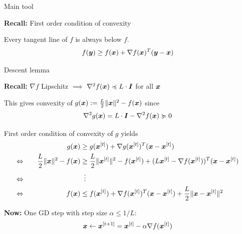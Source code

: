 \documentclass[11pt,compress,t,notes=noshow, xcolor=table]{beamer}
\begin{document}
\begin{framei}{Main tool}
\item\textbf{Recall:} First order condition of convexity
\begin{framed}\centering
Every tangent line of $f$ is always below $f$.
$$f(\bm{y}) \geq f(\bm{x}) + \nabla f(\bm{x})^T (\bm{y} - \bm{x})$$
\end{framed}
\end{framei}


\begin{framei}{Descent lemma}
\item\textbf{Recall:} $\nabla f$ Lipschitz $\implies$ $\nabla^2 f(\bm{x}) \preccurlyeq L \cdot \bm{I}$ for all $\bm{x}$
\item This gives convexity of $g(\bm{x}) := \frac{L}{2}\|\bm{x}\|^2 - f(\bm{x})$ since $$\nabla^2 g(\bm{x}) = L \cdot \bm{I} - \nabla^2 f(\bm{x}) \succcurlyeq 0$$
\item First order condition of convexity of $g$ yields
\begin{alignat*}{3}
&& g(\xv) &\geq g(\xv^{[t]}) + \nabla g(\xv^{[t]})^T (\xv - \xv^{[t]}) \\
\Leftrightarrow \quad && \frac{L}{2} \|\xv\|^2 - f(\xv) &\geq \frac{L}{2} \|\xv^{[t]}\|^2 - f(\xv^{[t]}) + (L\xv^{[t]} - \nabla f(\xv^{[t]}))^T (\xv - \xv^{[t]}) \\
\Leftrightarrow \quad && &\vdotswithin{\geq} \\
\Leftrightarrow \quad && \fx &\leq f(\xv^{[t]}) + \nabla f(\xv^{[t]})^T (\xv - \xv^{[t]}) + \frac{L}{2} \|\xv - \xv^{[t]}\|^2
\end{alignat*}
\item\textbf{Now:} One GD step with step size $\alpha \leq 1/L$:
$$\bm{x} \leftarrow \bm{x}^{[t+1]} = \bm{x}^{[t]} - \alpha \nabla f(\bm{x}^{[t]})$$
\end{framei}
\end{document}
